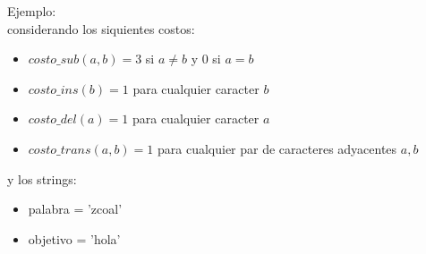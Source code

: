 Ejemplo:\\
considerando los siquientes costos:
\begin{itemize}
    \item $costo\_sub(a,b) = 3$ si $a \neq b$ y $0$ si $a = b$
    \item $costo\_ins(b) = 1$ para cualquier caracter $b$
    \item $costo\_del(a) = 1$ para cualquier caracter $a$
    \item $costo\_trans(a,b) = 1$ para cualquier par de caracteres adyacentes $a, b$
\end{itemize}
y los strings:
\begin{itemize}
    \item palabra = 'zcoal'
    \item objetivo = 'hola'
\end{itemize}

